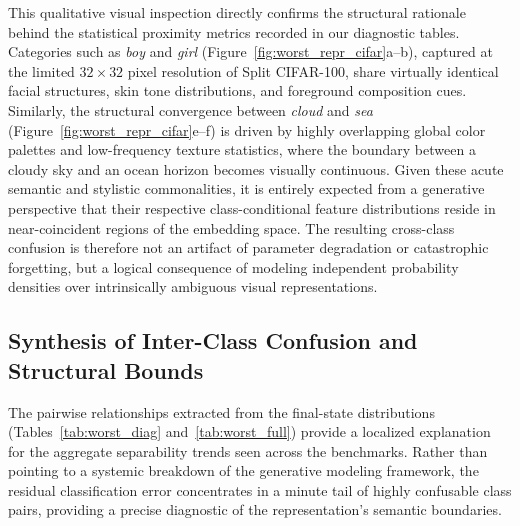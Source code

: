 This qualitative visual inspection directly confirms the structural rationale behind the statistical proximity metrics recorded in our diagnostic tables. Categories such as \textit{boy} and \textit{girl} (Figure~\ref{fig:worst_repr_cifar}a--b), captured at the limited $32\times32$ pixel resolution of Split CIFAR-100, share virtually identical facial structures, skin tone distributions, and foreground composition cues. Similarly, the structural convergence between \textit{cloud} and \textit{sea} (Figure~\ref{fig:worst_repr_cifar}e--f) is driven by highly overlapping global color palettes and low-frequency texture statistics, where the boundary between a cloudy sky and an ocean horizon becomes visually continuous. Given these acute semantic and stylistic commonalities, it is entirely expected from a generative perspective that their respective class-conditional feature distributions reside in near-coincident regions of the embedding space. The resulting cross-class confusion is therefore not an artifact of parameter degradation or catastrophic forgetting, but a logical consequence of modeling independent probability densities over intrinsically ambiguous visual representations.

\subsection{Synthesis of Inter-Class Confusion and Structural Bounds}
\label{sec:an:confusion}

The pairwise relationships extracted from the final-state distributions (Tables~\ref{tab:worst_diag} and~\ref{tab:worst_full}) provide a localized explanation for the aggregate separability trends seen across the benchmarks. Rather than pointing to a systemic breakdown of the generative modeling framework, the residual classification error concentrates in a minute tail of highly confusable class pairs, providing a precise diagnostic of the representation's semantic boundaries.

